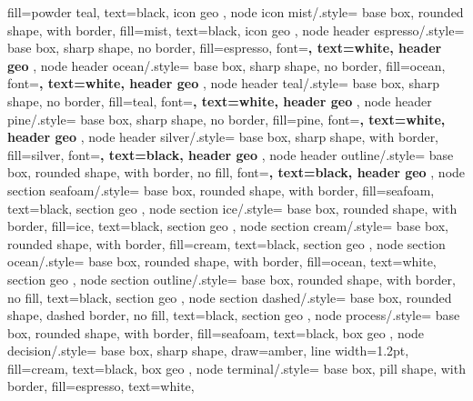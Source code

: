 {{		fill=powder teal, text=black, icon geo
	},
	node icon mist/.style={
		base box, rounded shape, with border,
		fill=mist, text=black, icon geo
	},
	node header espresso/.style={
		base box, sharp shape, no border,
		fill=espresso,
		font=\large\sffamily\bfseries,
		text=white, header geo
	},
	node header ocean/.style={
		base box, sharp shape, no border,
		fill=ocean,
		font=\large\sffamily\bfseries,
		text=white, header geo
	},
	node header teal/.style={
		base box, sharp shape, no border,
		fill=teal,
		font=\large\sffamily\bfseries,
		text=white, header geo
	},
	node header pine/.style={
		base box, sharp shape, no border,
		fill=pine,
		font=\large\sffamily\bfseries,
		text=white, header geo
	},
	node header silver/.style={
		base box, sharp shape, with border,
		fill=silver,
		font=\large\sffamily\bfseries,
		text=black, header geo
	},
	node header outline/.style={
		base box, rounded shape, with border,
		no fill,
		font=\large\sffamily\bfseries,
		text=black, header geo
	},
	node section seafoam/.style={
		base box, rounded shape, with border,
		fill=seafoam, text=black, section geo
	},
	node section ice/.style={
		base box, rounded shape, with border,
		fill=ice, text=black, section geo
	},
	node section cream/.style={
		base box, rounded shape, with border,
		fill=cream, text=black, section geo
	},
	node section ocean/.style={
		base box, rounded shape, with border,
		fill=ocean, text=white, section geo
	},
	node section outline/.style={
		base box, rounded shape, with border,
		no fill, text=black, section geo
	},
	node section dashed/.style={
		base box, rounded shape, dashed border,
		no fill, text=black, section geo
	},
	node process/.style={
		base box, rounded shape, with border,
		fill=seafoam, text=black, box geo
	},
	node decision/.style={
		base box, sharp shape,
		draw=amber, line width=1.2pt,
		fill=cream, text=black, box geo
	},
	node terminal/.style={
		base box, pill shape, with border,
		fill=espresso, text=white,
}}
